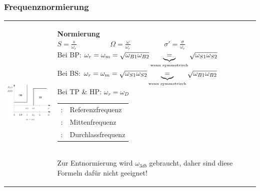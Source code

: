 \subsubsection{Frequenznormierung }
\label{frequenznormierung}
\begin{tabular}{ll}
\parbox{6cm}{
	\includegraphics[width=5cm]{./images/filter-freqnormierung.png}}
& \parbox{12cm}{
	\textbf{Normierung} \\
	$\boxed{S=\frac{s}{\omega_{r}} \hspace{2cm} \Omega=\frac{\omega}{\omega_{r}} 
  \hspace{2cm} \sigma'=\frac{\sigma}{\omega_{r}}}$\\ 

	Bei BP: $\omega_r = \omega_m =\sqrt{\omega_{B1} \omega_{B2}}
	\underbrace{=}_{\text{\tiny{wenn symmetrisch}}} \sqrt{\omega_{S1} \omega_{S2}}$ \\
	Bei BS: $\omega_r = \omega_m =\sqrt{\omega_{S1} \omega_{S2}}
	\underbrace{=}_{\text{\tiny{wenn symmetrisch}}} \sqrt{\omega_{B1} \omega_{B2}}$ \\
		
  Bei TP \& HP: $\omega_r = \omega_D$ \\

  \begin{tabular}{ll}
    $\omega_r$: & Referenzfrequenz \\
    $\omega_m$: & Mittenfrequenz \\
    $\omega_D$: & Durchlassfrequenz
  \end{tabular} \\
  Zur Entnormierung wird $\omega_{3db}$ gebraucht, daher sind diese Formeln
	dafür nicht geeignet! \\
	}
\end{tabular}



